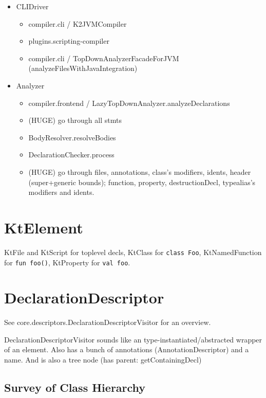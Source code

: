 \documentclass{article}
\begin{document}
\begin{itemize}
    \item CLIDriver
    \begin{itemize}
        \item compiler.cli / K2JVMCompiler
        \item plugins.scripting-compiler
        \item compiler.cli / TopDownAnalyzerFacadeForJVM (analyzeFilesWithJavaIntegration)
    \end{itemize}
    \item Analyzer
    \begin{itemize}
        \item compiler.frontend / LazyTopDownAnalyzer.analyzeDeclarations
        \item (HUGE) go through all stmts
        \item BodyResolver.resolveBodies
        \item DeclarationChecker.process
        \item (HUGE) go through files, annotations, class's modifiers, idents, header (super+generic bounds); function, property, destructionDecl, typealias's modifiers and idents.
    \end{itemize}
\end{itemize}

\section{KtElement}

KtFile and KtScript for toplevel decls,
KtClass for \texttt{class Foo}, KtNamedFunction for \texttt{fun foo()}, KtProperty for \texttt{val foo}.

\section{DeclarationDescriptor}
\label{sec:descriptor}

See core.descriptors.DeclarationDescriptorVisitor for an overview.

DeclarationDescriptorVisitor sounds like an type-instantiated/abstracted wrapper of an element. Also has a bunch of annotations (AnnotationDescriptor) and a name. And is also a tree node (has parent: getContainingDecl)

\subsection{Survey of Class Hierarchy}
\end{document}
